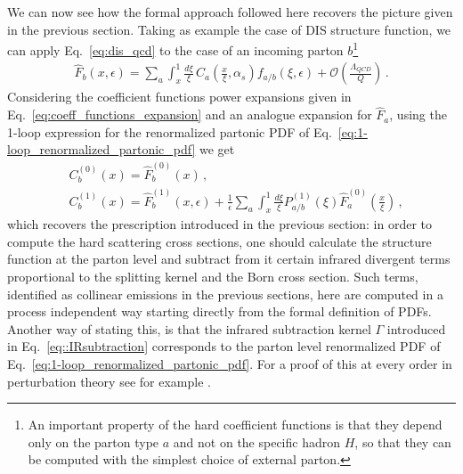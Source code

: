 %
We can now see how the formal approach followed here recovers the picture given in the previous section.
Taking as example the case of DIS structure function, we can apply Eq.~\ref{eq:dis_qcd} to the case of an 
incoming parton $b$\footnote{An important property of the hard coefficient functions is that they 
depend only on the parton type $a$ and not on the specific hadron $H$, 
so that they can be computed with the simplest choice of external parton.}
\begin{align}
    \label{eq:partonic_structure_function}
    \hat{F}_{b}\left(x,\epsilon\right) = 
    \sum_a \int_x^1\frac{d\xi}{\xi}\,C_a\left(\frac{x}{\xi}, \alpha_s\right)f_{a/b}\left(\xi,\epsilon\right)
    +\mathcal{O}\left(\frac{\Lambda_{QCD}}{Q}\right)\,.
\end{align}
Considering the coefficient functions power expansions given in Eq.~\eqref{eq:coeff_functions_expansion}
and an analogue expansion for $\hat{F}_{a}$, using the 1-loop expression for the
renormalized partonic PDF of Eq.~\eqref{eq:1-loop_renormalized_partonic_pdf} we get
\begin{align}
    \label{eq:IR_subtraction_from_formal_definition}
    &C^{(0)}_b\left(x\right) = \hat{F}_b^{(0)}\left(x\right)\,,\\
    &C^{(1)}_b\left(x\right) = \hat{F}_b^{(1)}\left(x,\epsilon\right) + \frac{1}{\epsilon}\sum_a\int_x^1 \frac{d\xi}{\xi}P_{a/b}^{(1)}\left(\xi\right)
    \hat{F}_a^{(0)}\left(\frac{x}{\xi}\right)\,,
\end{align}
which recovers the prescription introduced in the previous section: in order to compute
the hard scattering cross sections, one should calculate the structure function at the parton level and subtract
from it certain infrared divergent terms proportional to the splitting kernel and the Born cross section.
Such terms, identified as collinear emissions in the previous sections, here are computed in a process independent
way starting directly from the formal definition of PDFs.
Another way of stating this, is that the infrared subtraction kernel $\Gamma$ introduced in Eq.~\eqref{eq::IRsubtraction}
corresponds to the parton level renormalized PDF of Eq.~\eqref{eq:1-loop_renormalized_partonic_pdf}. For a proof
of this at every order in perturbation theory see for example \cite{Collins:1980ui}.


